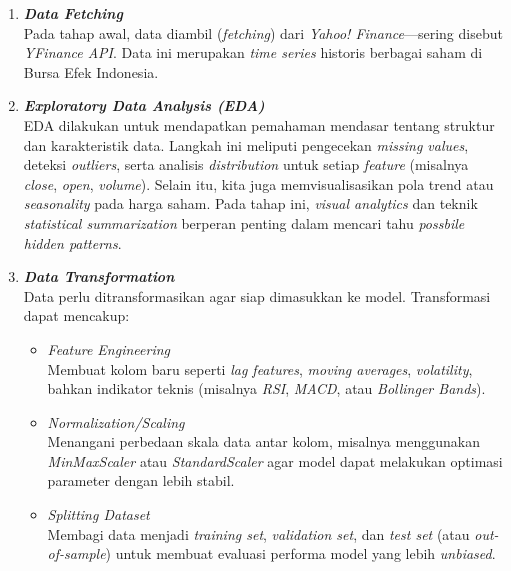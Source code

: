 \begin{enumerate} 

\item \textit{\textbf{Data Fetching}}  \\
Pada tahap awal, data diambil (\textit{fetching}) dari \textit{Yahoo! Finance}—sering disebut \textit{YFinance API}. Data ini merupakan \textit{time series} historis berbagai saham di Bursa Efek Indonesia. 

\item \textbf{\textit{Exploratory Data Analysis (EDA)}} \\
EDA dilakukan untuk mendapatkan pemahaman mendasar tentang struktur dan karakteristik data. Langkah ini meliputi pengecekan \textit{missing values}, deteksi \textit{outliers}, serta analisis \textit{distribution} untuk setiap \textit{feature} (misalnya \textit{close}, \textit{open}, \textit{volume}). Selain itu, kita juga memvisualisasikan pola trend atau \textit{seasonality} pada harga saham. Pada tahap ini, \textit{visual analytics} dan teknik \textit{statistical summarization} berperan penting dalam mencari tahu \textit{possbile hidden patterns}.  

\item \textbf{\textit{Data Transformation}} \\
Data perlu ditransformasikan agar siap dimasukkan ke model. Transformasi dapat mencakup:
\begin{itemize}
    \item \textit{Feature Engineering} \\
    Membuat kolom baru seperti \textit{lag features}, \textit{moving averages}, \textit{volatility}, bahkan indikator teknis (misalnya \textit{RSI}, \textit{MACD}, atau \textit{Bollinger Bands}).
    
    \item \textit{Normalization/Scaling} \\
    Menangani perbedaan skala data antar kolom, misalnya menggunakan \textit{MinMaxScaler} atau \textit{StandardScaler} agar model dapat melakukan optimasi parameter dengan lebih stabil. 
    \item \textit{Splitting Dataset} \\
    Membagi data menjadi \textit{training set}, \textit{validation set}, dan \textit{test set} (atau \textit{out-of-sample}) untuk membuat evaluasi performa model yang lebih \textit{unbiased}.
\end{itemize}


\end{enumerate}
